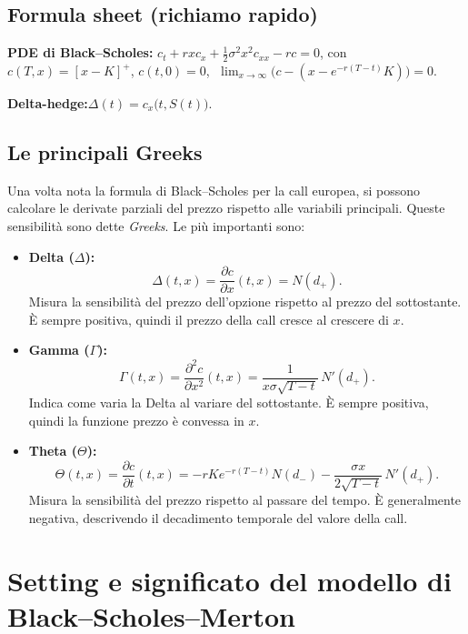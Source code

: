 \documentclass[12pt,a4paper]{book}
\theoremstyle{remark}
\begin{document}
\subsection*{Formula sheet (richiamo rapido)}
\noindent\textbf{PDE di Black--Scholes:}\quad
$c_t + r x c_x + \tfrac12 \sigma^2 x^2 c_{xx} - r c = 0$,
con
$c(T,x)=[x-K]^+$,
$c(t,0)=0$,
$\;\lim_{x\to\infty}\!\big(c-(x-e^{-r(T-t)}K)\big)=0$.

\medskip
\noindent\textbf{Delta-hedge:}\quad $\Delta(t)=c_x\big(t,S(t)\big)$.

\subsection{Le principali Greeks}

Una volta nota la formula di Black--Scholes per la call europea, si possono calcolare le derivate parziali del prezzo rispetto alle variabili principali. Queste sensibilità sono dette \emph{Greeks}. Le più importanti sono:

\begin{itemize}
  \item \textbf{Delta ($\Delta$):}
  \[
  \Delta(t,x) = \frac{\partial c}{\partial x}(t,x) = N(d_+).
  \]
  Misura la sensibilità del prezzo dell’opzione rispetto al prezzo del sottostante. È sempre positiva, quindi il prezzo della call cresce al crescere di $x$.

  \item \textbf{Gamma ($\Gamma$):}
  \[
  \Gamma(t,x) = \frac{\partial^2 c}{\partial x^2}(t,x)
  = \frac{1}{x\sigma\sqrt{T-t}}\,N'(d_+).
  \]
  Indica come varia la Delta al variare del sottostante. È sempre positiva, quindi la funzione prezzo è convessa in $x$.

  \item \textbf{Theta ($\Theta$):}
  \[
  \Theta(t,x) = \frac{\partial c}{\partial t}(t,x)
  = -rK e^{-r(T-t)}N(d_-) - \frac{\sigma x}{2\sqrt{T-t}}\,N'(d_+).
  \]
  Misura la sensibilità del prezzo rispetto al passare del tempo. È generalmente negativa, descrivendo il decadimento temporale del valore della call.
\end{itemize}


\section{Setting e significato del modello di Black--Scholes--Merton}
\end{document}
